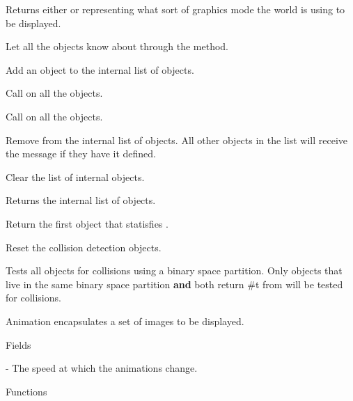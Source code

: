 
Returns either  or  representing what sort of graphics mode the world is using to be displayed.


Let all the objects know about  through the  method.


Add an object to the internal list of objects.


Call  on all the objects.


Call  on all the objects.


Remove  from the internal list of objects. All other objects in the list will receive the  message if they have it defined.


Clear the list of internal objects.


Returns the internal list of objects.


\newline
Return the first object that statisfies .


Reset the collision detection objects.


Tests all objects for collisions using a binary space partition. Only objects that live in the same binary space partition {\bf and} both return #t from  will be tested for collisions.


Animation encapsulates a set of images to be displayed.

Fields

 - The speed at which the animations change.

Functions


